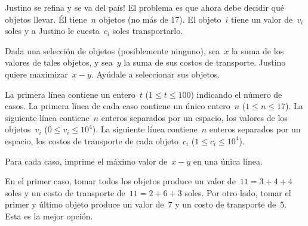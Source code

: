 
Justino se refina y se va del país! El problema es que ahora debe decidir qué objetos
llevar. Él tiene~$n$ objetos (no más de 17). El objeto~$i$ tiene un valor de~$v_i$
soles y a Justino le cuesta~$c_i$ soles transportarlo.

Dada una selección de objetos (posiblemente ninguno), sea~$x$ la suma de los valores
de tales objetos, y sea~$y$ la suma de sus costos de transporte. Justino quiere
maximizar~$x - y$. Ayúdale a seleccionar sus objetos.


La primera línea contiene un entero~$t$ ($1 \leq t \leq 100$) indicando el número de
casos. La primera línea de cada caso contiene un único entero~$n$
($1 \leq n \leq 17$). La siguiente línea contiene~$n$ enteros separados por un espacio, los
valores de los objetos~$v_i$ ($0 \leq v_i \leq 10^4$). La siguiente línea
contiene~$n$ enteros separados por un espacio, los costos de transporte de cada
objeto~$c_i$ ($1 \leq c_i \leq 10^4$).

\outputText

Para cada caso, imprime el máximo valor de~$x - y$ en una única línea.

\exampleCases

\begin{example}
\end{example}

\explanationText

En el primer caso, tomar todos los objetos produce un valor de~$11 = 3 + 4 + 4$ soles
y un costo de transporte de~$11 = 2 + 6 + 3$ soles. Por otro lado, tomar el primer y
último objeto produce un valor de~$7$ y un costo de transporte de~$5$. Esta es la
mejor opción.
